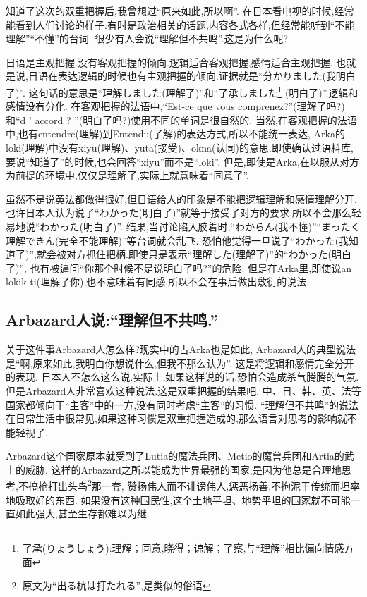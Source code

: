 知道了这次的双重把握后,我曾想过“原来如此,所以啊”.
在日本看电视的时候,经常能看到人们讨论的样子.有时是政治相关的话题,内容各式各样,但经常能听到“不能理解”“不懂”的台词.
很少有人会说“理解但不共鸣”.这是为什么呢?

日语是主观把握.没有客观把握的倾向.逻辑适合客观把握,感情适合主观把握.
也就是说,日语在表达逻辑的时候也有主观把握的倾向.证据就是“分かりました(我明白了)”.
这句话的意思是“理解しました(理解了)”和“了承しました\footnote{了承(りょうしょう):理解；同意,晓得；谅解；了察,与``理解''相比偏向情感方面}
(明白了)”.逻辑和感情没有分化.
在客观把握的法语中,“Est-ce que vous comprenez?”(理解了吗?)和``d ' accord ? ''(明白了吗?)使用不同的单词是很自然的.
当然,在客观把握的法语中,也有entendre(理解)到Entendu(了解)的表达方式,所以不能统一表达,
Arka的loki(理解)中没有xiyu(理解)、yuta(接受)、okna(认同)的意思.即使确认过语料库,要说“知道了”的时候,也会回答“xiyu”而不是“loki”.
但是,即使是Arka,在以服从对方为前提的环境中,仅仅是理解了,实际上就意味着“同意了”.

虽然不是说英法都做得很好,但日语给人的印象是不能把逻辑理解和感情理解分开.
也许日本人认为说了“わかった(明白了)”就等于接受了对方的要求,所以不会那么轻易地说“わかった(明白了)”.
结果,当讨论陷入胶着时,“わからん(我不懂)”“まったく理解できん(完全不能理解)”等台词就会乱飞.
恐怕他觉得一旦说了“わかった(我知道了)”,就会被对方抓住把柄.即使只是表示“理解した(理解了)”的“わかった(明白了)”,
也有被逼问“你那个时候不是说明白了吗?”的危险.
但是在Arka里,即使说an lokik ti(理解了你),也不意味着有同感,所以不会在事后做出敷衍的说法.
\subsection{Arbazard人说:``理解但不共鸣.''}
关于这件事Arbazard人怎么样?现实中的古Arka也是如此,
Arbazard人的典型说法是“啊,原来如此,我明白你想说什么,但我不那么认为”.
这是将逻辑和感情完全分开的表现.
日本人不怎么这么说.实际上,如果这样说的话,恐怕会造成杀气腾腾的气氛.
但是Arbazard人非常喜欢这种说法.这是双重把握的结果吧.
中、日、韩、英、法等国家都倾向于“主客”中的一方,没有同时考虑“主客”的习惯.
“理解但不共鸣”的说法在日常生活中很常见,如果这种习惯是双重把握造成的,那么语言对思考的影响就不能轻视了.

Arbazard这个国家原本就受到了Lutia的魔法兵团、Metio的魔兽兵团和Artia的武士的威胁.
这样的Arbazard之所以能成为世界最强的国家,是因为他总是合理地思考,不搞枪打出头鸟\footnote{原文为``出る杭は打たれる'',是类似的俗语}那一套,
赞扬伟人而不诽谤伟人,惩恶扬善,不拘泥于传统而坦率地吸取好的东西.
如果没有这种国民性,这个土地平坦、地势平坦的国家就不可能一直如此强大,甚至生存都难以为继.

